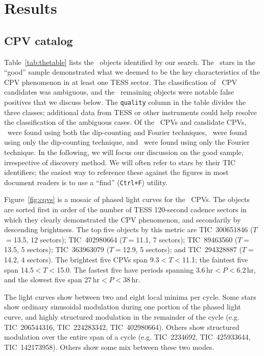 \documentclass[11pt,twocolumn,tighten]{aastex63}
\begin{document}
\section{Results}
\label{sec:results}

\subsection{CPV catalog}
\label{sec:catalog}

Table~\ref{tab:thetable} lists the \nallcands\ objects identified by
our search.  The \ngoods\ stars in the ``good'' sample demonstrated
what we deemed to be the key characteristics of the CPV phenomenon in
at least one TESS sector.  The classification of \nmaybes\ CPV
candidates was ambiguous, and the \ndebunked\ remaining objects were
notable false positives that we discuss below.  The \texttt{quality}
column in the table divides the three classes; additional data from
TESS or other instruments could help resolve the classification of the
ambiguous cases.   Of the \ncqvsnodebunked\ CPVs and candidate CPVs,
\nbothdipfourier\ were found using both the dip-counting and Fourier
techniques, \nyesdipnofourier\ were found using only the dip-counting
technique, and \nyesfouriernodip\ were found using only the Fourier
technique.  In the following, we will focus our discussion on the good
sample, irrespective of discovery method.  We will often refer to
stars by their TIC identifiers; the easiest way to reference these
against the figures in most document readers is to use a
``find'' ({\tt Ctrl+F}) utility.

Figure~\ref{fig:cqvs} is a mosaic of phased light curves for the
\ngoods\ CPVs.  The objects are sorted first in order of the number of
TESS 120-second cadence sectors in which they clearly demonstrated the
CPV phenomenon, and secondarily by descending brightness.  The top
five objects by this metric are TIC~300651846 ($T$$=$13.5, 12
sectors); TIC~402980664 ($T$$=$11.1, 7 sectors); TIC~89463560
($T$$=$13.5, 5 sectors); TIC~363963079 ($T$$=$12.9, 5 sectors); and
TIC~294328887 ($T$$=$14.2, 4 sectors).  The brightest five CPVs span
9.3$<$$T$$<$11.1; the faintest five span 14.5$<$$T$$<$15.0.  The
fastest five have periods spanning 3.6\,hr$<$$P$$<$6.2\,hr, and the
slowest five span 27\,hr$<$$P$$<$38\,hr.

The light curves show between two and eight local minima per cycle.
Some stars show ordinary sinusoidal modulation during one portion of
the phased light curve, and highly structured modulation in the
remainder of the cycle (e.g. TIC~206544316, TIC~224283342,
TIC~402980664).  Others show structured modulation over the entire
span of a cycle (e.g. TIC~2234692, TIC~425933644, TIC~142173958).
Others show some mix between these two modes.
\end{document}
